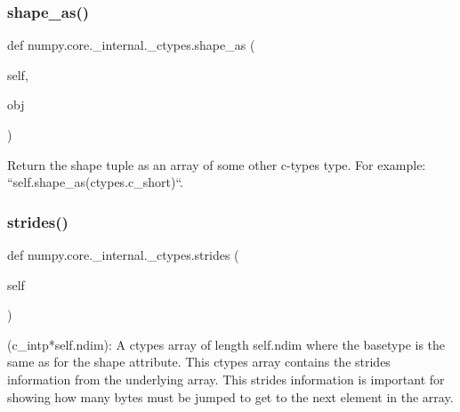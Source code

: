 \subsubsection{\texorpdfstring{shape\+\_\+as()}{shape\_as()}}
{\footnotesize\ttfamily def numpy.\+core.\+\_\+internal.\+\_\+ctypes.\+shape\+\_\+as (\begin{DoxyParamCaption}\item[{}]{self,  }\item[{}]{obj }\end{DoxyParamCaption})}

\begin{DoxyVerb}Return the shape tuple as an array of some other c-types
type. For example: ``self.shape_as(ctypes.c_short)``.
\end{DoxyVerb}
 \mbox{\label{classnumpy_1_1core_1_1__internal_1_1__ctypes_a24943eab345390d3f2ccdb19519108b1}} 
\subsubsection{\texorpdfstring{strides()}{strides()}}
{\footnotesize\ttfamily def numpy.\+core.\+\_\+internal.\+\_\+ctypes.\+strides (\begin{DoxyParamCaption}\item[{}]{self }\end{DoxyParamCaption})}

\begin{DoxyVerb}(c_intp*self.ndim): A ctypes array of length self.ndim where
the basetype is the same as for the shape attribute. This ctypes array
contains the strides information from the underlying array. This strides
information is important for showing how many bytes must be jumped to
get to the next element in the array.
\end{DoxyVerb}
 \mbox{\label{classnumpy_1_1core_1_1__internal_1_1__ctypes_a556e6c2bc96210705c6462bfe9f7258b}} 
